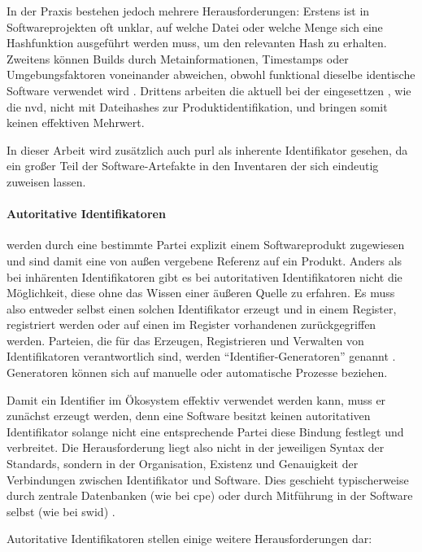 In der Praxis bestehen jedoch mehrere Herausforderungen:
Erstens ist in Softwareprojekten oft unklar, auf welche Datei oder welche Menge sich eine Hashfunktion ausgeführt werden muss, um den relevanten Hash zu erhalten.
Zweitens können Builds durch Metainformationen, Timestamps oder Umgebungsfaktoren voneinander abweichen, obwohl funktional dieselbe identische Software verwendet wird \autocite{CISA2023}.
Drittens arbeiten die aktuell bei der \metaeffektsp eingesettzen , wie die \acrshort{nvd}, nicht mit Dateihashes zur Produktidentifikation, und bringen somit keinen effektiven Mehrwert.

In dieser Arbeit wird zusätzlich auch \acrshort{purl} als inherente Identifikator gesehen, da ein großer Teil der Software-Artefakte in den Inventaren der \metaeffektsp sich eindeutig  zuweisen lassen.

\paragraph{Autoritative Identifikatoren} %
werden durch eine bestimmte Partei explizit einem Softwareprodukt zugewiesen und sind damit eine von außen vergebene Referenz auf ein Produkt.
Anders als bei inhärenten Identifikatoren gibt es bei autoritativen Identifikatoren nicht die Möglichkeit, diese ohne das Wissen einer äußeren Quelle zu erfahren.
Es muss also entweder selbst einen solchen Identifikator erzeugt und in einem Register, registriert werden oder auf einen im Register vorhandenen zurückgegriffen werden.
Parteien, die für das Erzeugen, Registrieren und Verwalten von Identifikatoren verantwortlich sind, werden \enquote{Identifier-Generatoren} genannt \autocite{CISA2023}.
Generatoren können sich auf manuelle oder automatische Prozesse beziehen.

Damit ein Identifier im Ökosystem effektiv verwendet werden kann, muss er zunächst erzeugt werden, denn eine Software besitzt keinen autoritativen Identifikator solange nicht eine entsprechende Partei diese Bindung festlegt und verbreitet.
Die Herausforderung liegt also nicht in der jeweiligen Syntax der Standards, sondern in der Organisation, Existenz und Genauigkeit der Verbindungen zwischen Identifikator und Software.
Dies geschieht typischerweise durch zentrale Datenbanken (wie bei \acrshort{cpe}) oder durch Mitführung in der Software selbst (wie bei \acrfull{swid}) \autocite{CISA2023}.

Autoritative Identifikatoren stellen einige weitere Herausforderungen dar:

